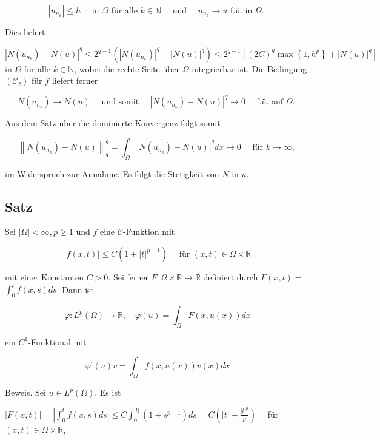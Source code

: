 \documentclass[10pt, letterpaper]{article}
\begin{document}
$$
\left|u_{n_{k}}\right| \leq h \quad \text { in } \Omega \text { für alle } k \in \mathbb{N} \quad \text { und } \quad u_{n_{k}} \rightarrow u \text { f.ü. in } \Omega \text {. }
$$

Dies liefert

$$
\left|N\left(u_{n_{k}}\right)-N(u)\right|^{q} \leq 2^{q-1}\left(\left|N\left(u_{n_{k}}\right)\right|^{q}+|N(u)|^{q}\right) \leq 2^{q-1}\left[(2 C)^{q} \max \left\{1, h^{p}\right\}+|N(u)|^{q}\right]
$$
in $\Omega$ für alle $k \in \mathbb{N}$, wobei die rechte Seite über $\Omega$ integrierbar ist. Die Bedingung $\left(\mathcal{C}_{2}\right)$ für $f$ liefert ferner

$$
N\left(u_{n_{k}}\right) \rightarrow N(u) \quad \text { und somit } \quad\left|N\left(u_{n_{k}}\right)-N(u)\right|^{q} \rightarrow 0 \quad \text { f.ü. auf } \Omega \text {. }
$$

Aus dem Satz über die dominierte Konvergenz folgt somit

$$
\left\|N\left(u_{n_{k}}\right)-N(u)\right\|_{q}^{q}=\int_{\Omega}\left|N\left(u_{n_{k}}\right)-N(u)\right|^{q} d x \rightarrow 0 \quad \text { für } k \rightarrow \infty \text {, }
$$

im Widerspruch zur Annahme. Es folgt die Stetigkeit von $N$ in $u$.

\subsection*{Satz}

Sei $|\Omega|<\infty, p \geq 1$ und $f$ eine $\mathcal{C}$-Funktion mit

$$
|f(x, t)| \leq C\left(1+|t|^{p-1}\right) \quad \text { für }(x, t) \in \Omega \times \mathbb{R}
$$

mit einer Konstanten $C>0$. Sei ferner $F: \Omega \times \mathbb{R} \rightarrow \mathbb{R}$ definiert durch $F(x, t)=$ $\int_{0}^{t} f(x, s) d s$. Dann ist

$$
\varphi: L^{p}(\Omega) \rightarrow \mathbb{R}, \quad \varphi(u)=\int_{\Omega} F(x, u(x)) d x
$$

ein $C^{1}$-Funktional mit

$$
\varphi^{\prime}(u) v=\int_{\Omega} f(x, u(x)) v(x) d x
$$

Beweis. Sei $u \in L^{p}(\Omega)$. Es ist

$|F(x, t)|=\left|\int_{0}^{t} f(x, s) d s\right| \leq C \int_{0}^{|t|}\left(1+s^{p-1}\right) d s=C\left(|t|+\frac{|t|^{p}}{p}\right) \quad$ für $(x, t) \in \Omega \times \mathbb{R}$,
\end{document}
